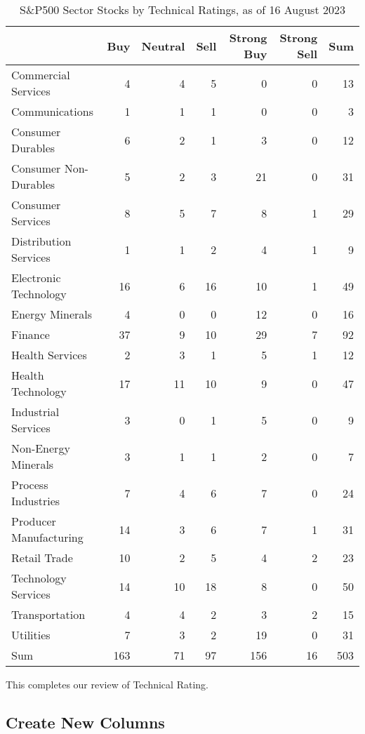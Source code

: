 \documentclass[
  letterpaper,
  DIV=11,
  numbers=noendperiod]{scrreport}
\begin{document}
\begin{table}

\caption{S&P500 Sector Stocks by Technical Ratings, as of 16 August 2023}
\centering
\begin{tabular}[t]{l|r|r|r|r|r|r}
\hline
  & Buy & Neutral & Sell & Strong Buy & Strong Sell & Sum\\
\hline
Commercial Services & 4 & 4 & 5 & 0 & 0 & 13\\
\hline
Communications & 1 & 1 & 1 & 0 & 0 & 3\\
\hline
Consumer Durables & 6 & 2 & 1 & 3 & 0 & 12\\
\hline
Consumer Non-Durables & 5 & 2 & 3 & 21 & 0 & 31\\
\hline
Consumer Services & 8 & 5 & 7 & 8 & 1 & 29\\
\hline
Distribution Services & 1 & 1 & 2 & 4 & 1 & 9\\
\hline
Electronic Technology & 16 & 6 & 16 & 10 & 1 & 49\\
\hline
Energy Minerals & 4 & 0 & 0 & 12 & 0 & 16\\
\hline
Finance & 37 & 9 & 10 & 29 & 7 & 92\\
\hline
Health Services & 2 & 3 & 1 & 5 & 1 & 12\\
\hline
Health Technology & 17 & 11 & 10 & 9 & 0 & 47\\
\hline
Industrial Services & 3 & 0 & 1 & 5 & 0 & 9\\
\hline
Non-Energy Minerals & 3 & 1 & 1 & 2 & 0 & 7\\
\hline
Process Industries & 7 & 4 & 6 & 7 & 0 & 24\\
\hline
Producer Manufacturing & 14 & 3 & 6 & 7 & 1 & 31\\
\hline
Retail Trade & 10 & 2 & 5 & 4 & 2 & 23\\
\hline
Technology Services & 14 & 10 & 18 & 8 & 0 & 50\\
\hline
Transportation & 4 & 4 & 2 & 3 & 2 & 15\\
\hline
Utilities & 7 & 3 & 2 & 19 & 0 & 31\\
\hline
Sum & 163 & 71 & 97 & 156 & 16 & 503\\
\hline
\end{tabular}
\end{table}

This completes our review of Technical Rating.

\hypertarget{create-new-columns}{%
\subsection{Create New Columns}\label{create-new-columns}}
\end{document}
